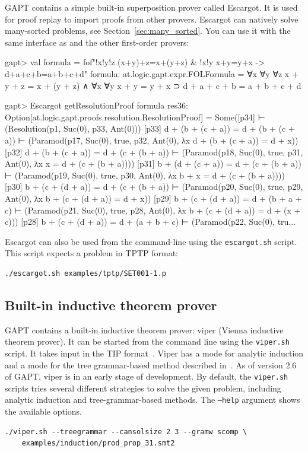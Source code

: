 \documentclass[a4paper,11pt]{article}
\newcommand{\cli}[1]{{\ttfamily {#1}}}
\begin{document}
GAPT contains a simple built-in superposition prover called Escargot.  It is
used for proof replay to import proofs from other provers. Escargot can natively
solve many-sorted problems, see Section~\ref{sec:many_sorted}. You can use it with
the same interface as \cli{Prover9} and the other first-order provers:

\begin{clilisting}
gapt> val formula = fof"!x!y!z (x+y)+z=x+(y+z) & !x!y x+y=y+x -> d+a+c+b=a+b+c+d"
formula: at.logic.gapt.expr.FOLFormula =
∀x ∀y ∀z x + y + z = x + (y + z) ∧ ∀x ∀y x + y = y + x ⊃
  d + a + c + b = a + b + c + d

gapt> Escargot getResolutionProof formula
res36: Option[at.logic.gapt.proofs.resolution.ResolutionProof] =
Some([p34]  ⊢    (Resolution(p1, Suc(0), p33, Ant(0)))
[p33] d + (b + (c + a)) = d + (b + (c + a)) ⊢    (Paramod(p17, Suc(0), true, p32, Ant(0), λx d + (b + (c + a)) = d + x))
[p32] d + (b + (c + a)) = d + (c + (b + a)) ⊢    (Paramod(p18, Suc(0), true, p31, Ant(0), λx x = d + (c + (b + a))))
[p31] b + (d + (c + a)) = d + (c + (b + a)) ⊢    (Paramod(p19, Suc(0), true, p30, Ant(0), λx b + x = d + (c + (b + a))))
[p30] b + (c + (d + a)) = d + (c + (b + a)) ⊢    (Paramod(p20, Suc(0), true, p29, Ant(0), λx b + (c + (d + a)) = d + x))
[p29] b + (c + (d + a)) = d + (b + a + c) ⊢    (Paramod(p21, Suc(0), true, p28, Ant(0), λx b + (c + (d + a)) = d + (x + c)))
[p28] b + (c + (d + a)) = d + (a + b + c) ⊢    (Paramod(p22, Suc(0), tru...
\end{clilisting}

Escargot can also be used from the command-line using the \texttt{escargot.sh}
script.  This script expects a problem in TPTP format:
\begin{lstlisting}
./escargot.sh examples/tptp/SET001-1.p
\end{lstlisting}

\subsection{Built-in inductive theorem prover}

GAPT contains a built-in inductive theorem prover: viper (Vienna inductive theorem prover). It
can be started from the command line using the \texttt{viper.sh} script. It takes input in the
TIP format~\cite{Claessen15TIP}. Viper has a mode for analytic induction and a mode for 
the tree grammar-based method described in~\cite{Eberhard15Inductive}. As of version 2.6 of GAPT,
viper is in an early stage of development.  By default, the \texttt{viper.sh}
scripts tries several different strategies to solve the given problem,
including analytic induction and tree-grammar-based methods.  The
\texttt{--help} argument shows the available options.
\begin{lstlisting}
./viper.sh --treegrammar --cansolsize 2 3 --gramw scomp \
    examples/induction/prod_prop_31.smt2
\end{lstlisting}
\end{document}
